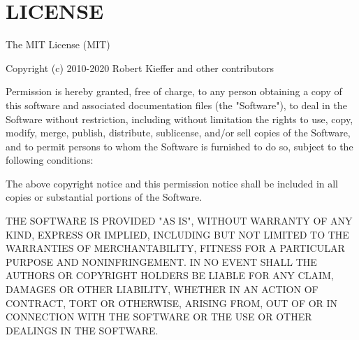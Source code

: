 \chapter{LICENSE}
\hypertarget{md_pkiclassroomrescheduler_2src_2main_2frontend_2node__modules_2uuid_2_l_i_c_e_n_s_e}{}\label{md_pkiclassroomrescheduler_2src_2main_2frontend_2node__modules_2uuid_2_l_i_c_e_n_s_e}
The MIT License (MIT)

Copyright (c) 2010-\/2020 Robert Kieffer and other contributors

Permission is hereby granted, free of charge, to any person obtaining a copy of this software and associated documentation files (the "{}\+Software"{}), to deal in the Software without restriction, including without limitation the rights to use, copy, modify, merge, publish, distribute, sublicense, and/or sell copies of the Software, and to permit persons to whom the Software is furnished to do so, subject to the following conditions\+:

The above copyright notice and this permission notice shall be included in all copies or substantial portions of the Software.

THE SOFTWARE IS PROVIDED "{}\+AS IS"{}, WITHOUT WARRANTY OF ANY KIND, EXPRESS OR IMPLIED, INCLUDING BUT NOT LIMITED TO THE WARRANTIES OF MERCHANTABILITY, FITNESS FOR A PARTICULAR PURPOSE AND NONINFRINGEMENT. IN NO EVENT SHALL THE AUTHORS OR COPYRIGHT HOLDERS BE LIABLE FOR ANY CLAIM, DAMAGES OR OTHER LIABILITY, WHETHER IN AN ACTION OF CONTRACT, TORT OR OTHERWISE, ARISING FROM, OUT OF OR IN CONNECTION WITH THE SOFTWARE OR THE USE OR OTHER DEALINGS IN THE SOFTWARE. 